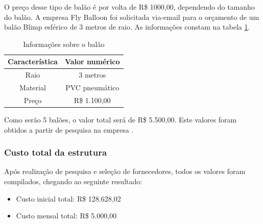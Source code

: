 \begin{enumerate}
		O preço desse tipo de balão é por volta de R\$ 1000,00, dependendo do tamanho do balão. A empresa Fly Balloon foi solicitada via-email para o orçamento de um balão Blimp esférico de 3 metros de raio. As informações constam na tabela \ref{tab:precoblimp}.

		\begin{table}[htp]
			\centering
			\caption{Informações sobre o balão}
			\begin{tabular}{ | c | c |}
				\hline
				\textbf{Característica} &\textbf{Valor numérico} \\ \hline
				Raio & 3 metros  \\ \hline
				Material  & PVC pneumático \\
				 \hline
				Preço  & R\$ 1.100,00 \\
				 \hline
			\end{tabular}
			\label{tab:precoblimp}
		\end{table}

		Como serão 5 balões, o valor total será de  R\$ 5.500,00. Este valores foram obtidos a partir de pesquisa na empresa \cite{balloon}.
\end{enumerate}

\subsubsection{Custo total da estrutura}

	Após realização de pesquisa e seleção de fornecedores, todos os valores foram compilados, chegando ao seguinte resultado:

\begin{itemize}
	\item Custo inicial total: R\$ 128.628,02
	\item Custo mensal total: R\$ 5.000,00
\end{itemize}
